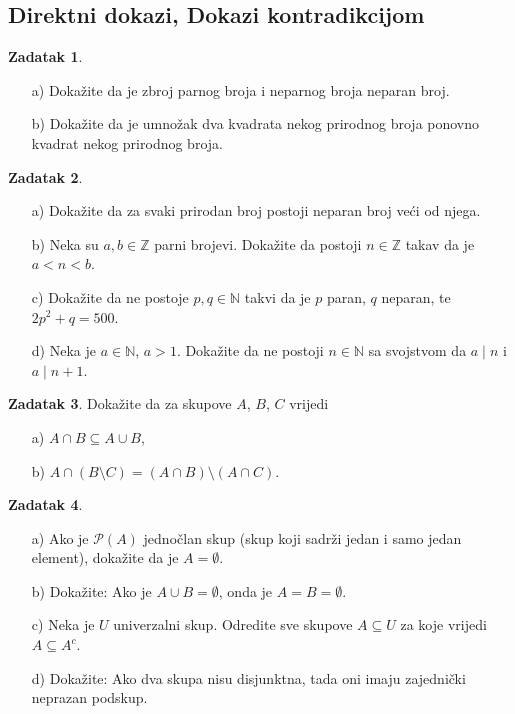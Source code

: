 \documentclass{book}
\theoremstyle{definition}
\theoremstyle{definition}
\newtheorem{exercise}{Zadatak}
\theoremstyle{remark}
\begin{document}
\subsection*{Direktni dokazi, Dokazi kontradikcijom}
\begin{exercise} \textbf{}
\begin{itemize}
\item[a)] Dokažite da je zbroj parnog broja i neparnog broja neparan broj.
\item[b)] Dokažite da je umnožak dva kvadrata nekog prirodnog broja ponovno kvadrat nekog prirodnog broja.
\end{itemize}
\end{exercise}
\begin{exercise} \textbf{}
\begin{itemize}
\item[a)] Dokažite da za svaki prirodan broj postoji neparan broj veći od njega.
\item[b)] Neka su $a, b\in \mathbb{Z}$ parni brojevi. Dokažite da postoji $n\in \mathbb{Z}$ takav da je $a<n<b$.
\item[c)] Dokažite da ne postoje $p, q\in \mathbb{N}$ takvi da je $p$ paran, $q$ neparan, te $2p^2+q=500$.
\item[d)] Neka je $a\in \mathbb{N}$, $a>1$. Dokažite da ne postoji $n\in \mathbb{N}$ sa svojstvom da $a \mid n$ i $a \mid n+1$.
\end{itemize}
\end{exercise}
\begin{exercise}
Dokažite da za skupove $A$, $B$, $C$ vrijedi
\begin{itemize}
\item[a)] $A\cap B\subseteq A\cup B$,
\item[b)] $A\cap (B\setminus C)=(A\cap B)\setminus (A\cap C)$.
\end{itemize}
\end{exercise}
\begin{exercise} \textbf{} 
\begin{itemize}
\item[a)] Ako je $\mathcal{P}(A)$ jednočlan skup (skup koji sadrži jedan i samo jedan element), dokažite da je $A=\emptyset$.
\item[b)] Dokažite: Ako je $A\cup B=\emptyset$, onda je $A=B=\emptyset$.
\item[c)] Neka je $U$ univerzalni skup. Odredite sve skupove $A\subseteq U$ za koje vrijedi $A\subseteq A^c$.
\item[d)] Dokažite: Ako dva skupa nisu disjunktna, tada oni imaju zajednički neprazan podskup.
\end{itemize}
\end{exercise}
\end{document}
